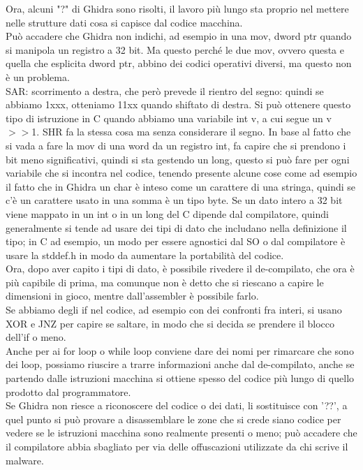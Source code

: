 \documentclass[12pt, oneside]{extbook}
\begin{document}
Ora, alcuni "?" di Ghidra sono risolti, il lavoro più lungo sta proprio nel mettere nelle strutture dati cosa si capisce dal codice macchina.\\ Può accadere che Ghidra non indichi, ad esempio in una mov, dword ptr quando si manipola un registro a 32 bit. Ma questo perché le due mov, ovvero questa e quella che esplicita dword ptr, abbino dei codici operativi diversi, ma questo non è un problema.\\ \textsf{SAR}: scorrimento a destra, che però prevede il rientro del segno: quindi se abbiamo 1xxx, otteniamo 11xx quando shiftato di destra. Si può ottenere questo tipo di istruzione in C quando abbiamo una variabile \textsf{int v}, a cui segue un v $>>$1. \textsf{SHR} fa la stessa cosa ma senza considerare il segno. In base al fatto che si vada a fare la mov di una word da un registro int, fa capire che si prendono i bit meno significativi, quindi si sta gestendo un long, questo si può fare per ogni variabile che si incontra nel codice, tenendo presente alcune cose come ad esempio il fatto che in Ghidra un char è inteso come un carattere di una stringa, quindi se c'è un carattere usato in una somma è un tipo byte. Se un dato intero a 32 bit viene mappato in un int o in un long del C dipende dal compilatore, quindi generalmente si tende ad usare dei tipi di dato che includano nella definizione il tipo; in C ad esempio, un modo per essere agnostici dal SO o dal compilatore è usare la stddef.h in modo da aumentare la portabilità del codice.\\ Ora, dopo aver capito i tipi di dato, è possibile rivedere il de-compilato, che ora è più capibile di prima, ma comunque non è detto che si riescano a capire le dimensioni in gioco, mentre dall'assembler è possibile farlo.\\ Se abbiamo degli if nel codice, ad esempio con dei confronti fra interi, si usano XOR e JNZ per capire se saltare, in modo che si decida se prendere il blocco dell'if o meno. \\ Anche per ai for loop o while loop conviene dare dei nomi per rimarcare che sono dei loop, possiamo riuscire a trarre informazioni anche dal de-compilato, anche se partendo dalle istruzioni macchina si ottiene spesso del codice più lungo di quello prodotto dal programmatore.\\ Se Ghidra non riesce a riconoscere del codice o dei dati, li sostituisce con '??', a quel punto si può provare a disassemblare le zone che si crede siano codice per vedere se le istruzioni macchina sono realmente presenti o meno; può accadere che il compilatore abbia sbagliato per via delle offuscazioni utilizzate da chi scrive il malware.
\end{document}

